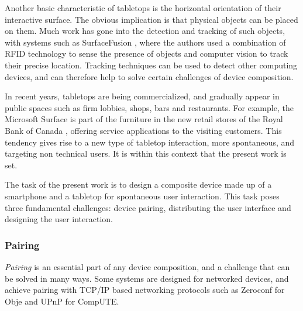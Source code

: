 Another basic characteristic of tabletops is the horizontal orientation of their interactive surface.
The obvious implication is that physical objects can be placed on them.
Much work has gone into the detection and tracking of such objects, with systems such as SurfaceFusion \citep{Olwal:2008:surfacefusion}, where the authors used a combination of RFID technology to sense the presence of objects and computer vision to track their precise location.
Tracking techniques can be used to detect other computing devices, and can therefore help to solve certain challenges of device composition.

%

In recent years, tabletops are being commercialized, and gradually appear in public spaces such as firm lobbies, shops, bars and restaurants.
For example, the Microsoft Surface is part of the furniture in the new retail stores of the Royal Bank of Canada \citep{mscase}, offering service applications to the visiting customers.
This tendency gives rise to a new type of tabletop interaction, more spontaneous, and targeting non technical users.
It is within this context that the present work is set.

The task of the present work is to design a composite device made up of a smartphone and a tabletop for spontaneous user interaction.
This task poses three fundamental challenges: device pairing, distributing the user interface and designing the user interaction.

\subsubsection{Pairing}

\emph{Pairing} is an essential part of any device composition, and a challenge that can be solved in many ways.
Some systems are designed for networked devices, and achieve pairing with TCP/IP based networking protocols such as Zeroconf \citeyearpar{zeroconf} for Obje and UPnP \citeyearpar{upnp} for CompUTE.

